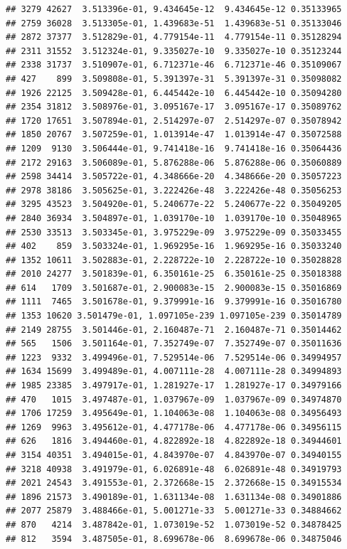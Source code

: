 \documentclass[
]{article}
\begin{document}
\begin{verbatim}
## 3279 42627  3.513396e-01, 9.434645e-12  9.434645e-12 0.35133965
## 2759 36028  3.513305e-01, 1.439683e-51  1.439683e-51 0.35133046
## 2872 37377  3.512829e-01, 4.779154e-11  4.779154e-11 0.35128294
## 2311 31552  3.512324e-01, 9.335027e-10  9.335027e-10 0.35123244
## 2338 31737  3.510907e-01, 6.712371e-46  6.712371e-46 0.35109067
## 427    899  3.509808e-01, 5.391397e-31  5.391397e-31 0.35098082
## 1926 22125  3.509428e-01, 6.445442e-10  6.445442e-10 0.35094280
## 2354 31812  3.508976e-01, 3.095167e-17  3.095167e-17 0.35089762
## 1720 17651  3.507894e-01, 2.514297e-07  2.514297e-07 0.35078942
## 1850 20767  3.507259e-01, 1.013914e-47  1.013914e-47 0.35072588
## 1209  9130  3.506444e-01, 9.741418e-16  9.741418e-16 0.35064436
## 2172 29163  3.506089e-01, 5.876288e-06  5.876288e-06 0.35060889
## 2598 34414  3.505722e-01, 4.348666e-20  4.348666e-20 0.35057223
## 2978 38186  3.505625e-01, 3.222426e-48  3.222426e-48 0.35056253
## 3295 43523  3.504920e-01, 5.240677e-22  5.240677e-22 0.35049205
## 2840 36934  3.504897e-01, 1.039170e-10  1.039170e-10 0.35048965
## 2530 33513  3.503345e-01, 3.975229e-09  3.975229e-09 0.35033455
## 402    859  3.503324e-01, 1.969295e-16  1.969295e-16 0.35033240
## 1352 10611  3.502883e-01, 2.228722e-10  2.228722e-10 0.35028828
## 2010 24277  3.501839e-01, 6.350161e-25  6.350161e-25 0.35018388
## 614   1709  3.501687e-01, 2.900083e-15  2.900083e-15 0.35016869
## 1111  7465  3.501678e-01, 9.379991e-16  9.379991e-16 0.35016780
## 1353 10620 3.501479e-01, 1.097105e-239 1.097105e-239 0.35014789
## 2149 28755  3.501446e-01, 2.160487e-71  2.160487e-71 0.35014462
## 565   1506  3.501164e-01, 7.352749e-07  7.352749e-07 0.35011636
## 1223  9332  3.499496e-01, 7.529514e-06  7.529514e-06 0.34994957
## 1634 15699  3.499489e-01, 4.007111e-28  4.007111e-28 0.34994893
## 1985 23385  3.497917e-01, 1.281927e-17  1.281927e-17 0.34979166
## 470   1015  3.497487e-01, 1.037967e-09  1.037967e-09 0.34974870
## 1706 17259  3.495649e-01, 1.104063e-08  1.104063e-08 0.34956493
## 1269  9963  3.495612e-01, 4.477178e-06  4.477178e-06 0.34956115
## 626   1816  3.494460e-01, 4.822892e-18  4.822892e-18 0.34944601
## 3154 40351  3.494015e-01, 4.843970e-07  4.843970e-07 0.34940155
## 3218 40938  3.491979e-01, 6.026891e-48  6.026891e-48 0.34919793
## 2021 24543  3.491553e-01, 2.372668e-15  2.372668e-15 0.34915534
## 1896 21573  3.490189e-01, 1.631134e-08  1.631134e-08 0.34901886
## 2077 25879  3.488466e-01, 5.001271e-33  5.001271e-33 0.34884662
## 870   4214  3.487842e-01, 1.073019e-52  1.073019e-52 0.34878425
## 812   3594  3.487505e-01, 8.699678e-06  8.699678e-06 0.34875046

\end{verbatim}
\end{document}
